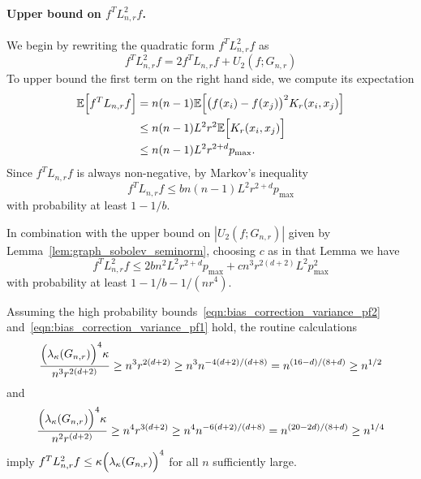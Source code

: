 \documentclass{article}
\newcommand{\abs}[1]{\left \lvert #1 \right \rvert}
\newcommand{\1}{\mathbf{1}}
\newcommand{\Ebb}{\mathbb{E}}
\theoremstyle{alden}
\theoremstyle{aldenthm}
\theoremstyle{definition}
\theoremstyle{remark}
\begin{document}
\paragraph{Upper bound on $f^T L_{n,r}^2 f$.}
We begin by rewriting the quadratic form $f^T L_{n,r}^2 f$ as
\begin{equation*}
f^T L_{n,r}^2 f = 2 f^T L_{n,r} f + U_2(f;G_{n,r})
\end{equation*}
To upper bound the first term on the right hand side, we compute its expectation
\begin{align*}
\Ebb \Bigl[f^T L_{n,r} f\Bigr] & = n(n - 1) \Ebb\Bigl[\bigl(f(x_i) - f(x_j)\bigr)^2 K_r(x_i,x_j)\Bigr] \\
& \leq n(n - 1) L^2 r^{2} \Ebb\Bigl[K_r(x_i,x_j)\Bigr] \\
& \leq n(n - 1) L^2 r^{2 + d} p_{\max}.
\end{align*}
Since $f^T L_{n,r} f$ is always non-negative, by Markov's inequality
\begin{equation*}
f^T L_{n,r} f \leq b n(n - 1) L^2 r^{2 + d} p_{\max} 
\end{equation*}
with probability at least $1 - 1/b$. 

In combination with the upper bound on $\abs{U_2(f;G_{n,r})}$ given by  Lemma~\ref{lem:graph_sobolev_seminorm}, choosing $c$ as in that Lemma we have
\begin{equation}
\label{eqn:bias_correction_variance_pf1}
f^T L_{n,r}^2 f \leq 2 b n^2 L^2 r^{2 + d} p_{\max} + c n^3 r^{2(d + 2)} L^2 p_{\max}^2
\end{equation}
with probability at least $1 - 1/b - 1/(nr^4)$. 

Assuming the high probability bounds~\eqref{eqn:bias_correction_variance_pf2} and~\eqref{eqn:bias_correction_variance_pf1} hold, the routine calculations
\begin{equation*}
\frac{\Bigl(\lambda_{\kappa}(G_{n,r})\Bigr)^4 \kappa}{n^3 r^{2(d + 2)}} \geq n^3 r^{2(d + 2)} \geq n^{3} n^{-4(d + 2)/(d + 8)} = n^{(16 - d)/(8 + d)} \geq n^{1/2}
\end{equation*}
and
\begin{equation*}
\frac{\Bigl(\lambda_{\kappa}(G_{n,r})\Bigr)^4\kappa}{n^2 r^{(d + 2)}} \geq n^4 r^{3(d + 2)} \geq n^{4} n^{-6(d + 2)/(d + 8)} = n^{(20 - 2d)/(8 + d)} \geq n^{1/4} 
\end{equation*}
imply $f^T L_{n,r}^2 f \leq \kappa\Bigl(\lambda_{\kappa}(G_{n,r})\Bigr)^4$ for all $n$ sufficiently large. 
\end{document}
